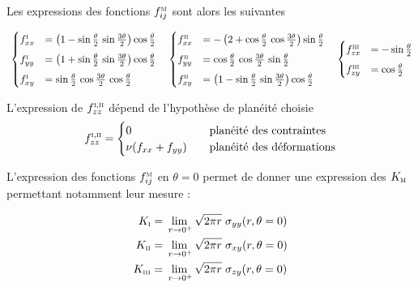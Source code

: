 Les expressions des fonctions $f_{ij}^\textsc{m}$ sont alors les suivantes\,\cite{sun_fracture_2012}



\begin{equation}
\resizebox{150mm}{!}{
$
\begin{cases}
	f^\textsc{i}_{xx}&=\left(1-\sin\frac{\theta}{2}\,\sin\frac{3\theta}{2} \right)\cos\frac{\theta}{2}\\[.5em]
	f^\textsc{i}_{yy}&=\left(1+\sin\frac{\theta}{2}\,\sin\frac{3\theta}{2} \right)\cos\frac{\theta}{2}\\[.5em]
	f^\textsc{i}_{xy}&=\sin\frac{\theta}{2}\,\cos\frac{3\theta}{2}\,\cos\frac{\theta}{2}
\end{cases}
\quad
\begin{cases}
	f^\textsc{ii}_{xx}&=-\left(2+\cos\frac{\theta}{2}\,\cos\frac{3\theta}{2}\right)\sin\frac{\theta}{2}\\[.5em]
	f^\textsc{ii}_{yy}&=\cos\frac{\theta}{2}\,\cos\frac{3\theta}{2}\,\sin\frac{\theta}{2}\\[.5em]
	f^\textsc{ii}_{xy}&=\left(1-\sin\frac{\theta}{2}\,\sin\frac{3\theta}{2} \right)\cos\frac{\theta}{2}
\end{cases}
\quad
\begin{cases}
	f^\textsc{iii}_{zx}&=-\sin\frac{\theta}{2}\\[.5em]
	f^\textsc{iii}_{zy}&=\cos\frac{\theta}{2}\\
\end{cases}
$}
\end{equation}

L'expression de $f_{zz}^{\textsc{i},\textsc{ii}}$ dépend de l'hypothèse de planéité choisie
\begin{equation}
f_{zz}^{\textsc{i},\textsc{ii}}=
\begin{cases}
0&\quad\text{planéité des contraintes}\\
\nu(f_{xx}+f_{yy})&\quad\text{planéité des déformations}
\end{cases}
\end{equation}


L'expression des fonctions $f^\textsc{m}_{ij}$ en $\theta=0$ permet de donner une expression des $K_\textsc{m}$ permettant notamment leur mesure :

\begin{equation}
\begin{aligned}
K_\textsc{i}&=\lim_{\:r\rightarrow 0^+}\sqrt{2\pi r}\;\sigma_{yy}(r,\theta=0)\\
K_\textsc{ii}&=\lim_{\:r\rightarrow 0^+}\sqrt{2\pi r}\;\sigma_{xy}(r,\theta=0)\\
K_\textsc{iii}&=\lim_{\:r\rightarrow 0^+}\sqrt{2\pi r}\;\sigma_{zy}(r,\theta=0)
\end{aligned}
\end{equation}


